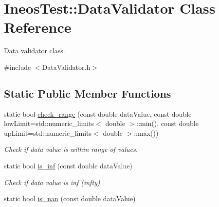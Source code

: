 \hypertarget{classIneosTest_1_1DataValidator}{\section{Ineos\-Test\-:\-:Data\-Validator Class Reference}
\label{classIneosTest_1_1DataValidator}
}


Data validator class.  




{\ttfamily \#include $<$Data\-Validator.\-h$>$}

\subsection*{Static Public Member Functions}
\begin{DoxyCompactItemize}
\item 
\hypertarget{classIneosTest_1_1DataValidator_aadbf87f53207d93e7005a9521ff56e19}{static bool \hyperlink{classIneosTest_1_1DataValidator_aadbf87f53207d93e7005a9521ff56e19}{check\-\_\-range} (const double data\-Value, const double low\-Limit=std\-::numeric\-\_\-limits$<$ double $>$\-::min(), const double up\-Limit=std\-::numeric\-\_\-limits$<$ double $>$\-::max())}\label{classIneosTest_1_1DataValidator_aadbf87f53207d93e7005a9521ff56e19}

\begin{DoxyCompactList}\small\item\em Check if data value is within range of values. \end{DoxyCompactList}\item 
\hypertarget{classIneosTest_1_1DataValidator_ac0e1c6410ab65ef6b6e73f08fe205f67}{static bool \hyperlink{classIneosTest_1_1DataValidator_ac0e1c6410ab65ef6b6e73f08fe205f67}{is\-\_\-inf} (const double data\-Value)}\label{classIneosTest_1_1DataValidator_ac0e1c6410ab65ef6b6e73f08fe205f67}

\begin{DoxyCompactList}\small\item\em Check if data value is inf (infty) \end{DoxyCompactList}\item 
\hypertarget{classIneosTest_1_1DataValidator_af878f521fd9b72d1bc788c3adadb8746}{static bool \hyperlink{classIneosTest_1_1DataValidator_af878f521fd9b72d1bc788c3adadb8746}{is\-\_\-nan} (const double data\-Value)}\label{classIneosTest_1_1DataValidator_af878f521fd9b72d1bc788c3adadb8746}


\end{DoxyCompactItemize}
